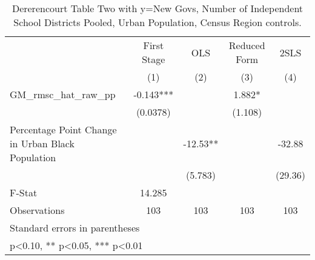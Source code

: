\begin{table}[htbp]\centering
\def\sym#1{\ifmmode^{#1}\else\(^{#1}\)\fi}
\caption{Dererencourt Table Two with y=New Govs, Number of Independent School Districts  Pooled, Urban Population, Census Region controls.}
\begin{tabular}{l*{4}{c}}
\toprule
                    & First Stage   &         OLS   &Reduced Form   &        2SLS   \\
                    &\multicolumn{1}{c}{(1)}   &\multicolumn{1}{c}{(2)}   &\multicolumn{1}{c}{(3)}   &\multicolumn{1}{c}{(4)}   \\
\midrule
GM\_rmsc\_hat\_raw\_pp  &      -0.143***&               &       1.882*  &               \\
                    &    (0.0378)   &               &     (1.108)   &               \\
\addlinespace
Percentage Point Change in Urban Black Population&               &      -12.53** &               &      -32.88   \\
                    &               &     (5.783)   &               &     (29.36)   \\
\midrule
F-Stat              &      14.285   &               &               &               \\
Observations        &         103   &         103   &         103   &         103   \\
\bottomrule
\multicolumn{5}{l}{\footnotesize Standard errors in parentheses}\\
\multicolumn{5}{l}{\footnotesize * p<0.10, ** p<0.05, *** p<0.01}\\
\end{tabular}
\end{table}
